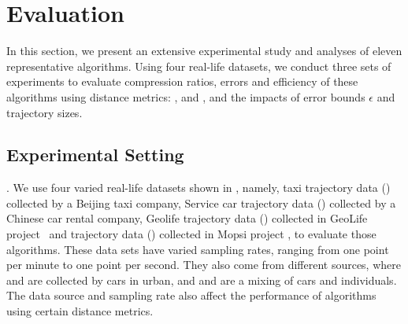 \section{Evaluation} %
\label{sec-exp}
In this section, we present an extensive experimental study and analyses of eleven representative \lsa algorithms.
Using four real-life datasets, we conduct three sets of experiments to evaluate compression ratios, errors and efficiency of these algorithms using distance metrics: \ped, \sed and \dad, and the impacts of error bounds $\epsilon$ and trajectory sizes.
%

\subsection{Experimental Setting}

.
We use four varied real-life datasets shown in , namely, taxi trajectory data (\taxi) collected by a Beijing taxi company, Service car trajectory data (\ucar) collected by a Chinese car rental company, Geolife trajectory data (\geolife) collected in GeoLife project~\cite{Web:Geolife} and \mopsi trajectory data (\mopsi) collected in Mopsi project \cite{Web:Mopsi}, to evaluate those \lsa algorithms. These data sets have varied sampling rates, ranging from one point per minute to one point per second.
They also come from different sources, where \taxi and \ucar are collected by cars in urban, and \geolife and \mopsi are a mixing of cars and individuals. The data source and sampling rate also affect the performance of \lsa algorithms using certain distance metrics.

